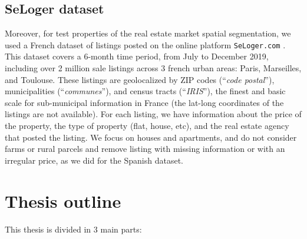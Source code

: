 \subsection{\label{subsec:SeLoger dataset} SeLoger dataset}

Moreover, for test properties of the real estate market spatial segmentation, we used a French dataset of listings posted on the online platform \texttt{SeLoger.com} \cite{SeLoger}. This dataset covers a 6-month time period, from July to December 2019, including over 2 million sale listings across 3 french urban areas: Paris, Marseilles, and Toulouse. These listings are geolocalized by ZIP codes (``\textit{code postal}''), municipalities (``\textit{communes}''), and census tracts (``\textit{IRIS}''), the finest and basic scale for sub-municipal information in France (the lat-long coordinates of the listings are not available). For each listing, we have information about the price of the property, the type of property (flat, house, etc), and the real estate agency that posted the listing. We focus on houses and apartments, and do not consider farms or rural parcels and remove listing with missing information or with an irregular price, as we did for the Spanish dataset.

\section{\label{sec:Thesis outline} Thesis outline}

This thesis is divided in 3 main parts:

